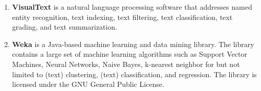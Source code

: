 \begin{enumerate}
	\item \textbf{VisualText} \cite{visualtext} is a natural language processing software that addresses named entity recognition, text indexing, text filtering, text classification, text grading, and text summarization.

	\item \textbf{Weka} \cite{hall2009weka} is a Java-based machine learning and data mining library. The library contains a large set of machine learning algorithms such as Support Vector Machines, Neural Networks, Naive Bayes, k-nearest neighbor for but not limited to (text) clustering, (text) classification, and regression.
The library is licensed under the GNU General Public License.

\end{enumerate}
